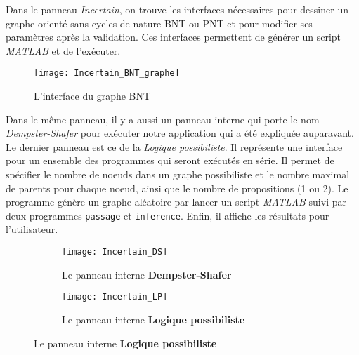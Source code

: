 Dans le panneau \textit{Incertain}, on trouve les interfaces nécessaires pour dessiner un graphe orienté sans
cycles de nature BNT ou PNT et pour modifier ses paramètres après la validation. Ces interfaces permettent de générer
un script \textit{MATLAB} et de l'exécuter.

\begin{figure}[H]
\centering
\texttt{[image: Incertain\_BNT\_graphe]}
\caption{L'interface du graphe BNT}
\end{figure}

Dans le même panneau, il y a aussi un panneau interne qui porte le nom \textit{Dempster-Shafer} pour exécuter
notre application \appname qui a été expliquée auparavant. Le dernier panneau est ce de la \textit{Logique possibiliste}.
Il représente une interface pour un ensemble des programmes qui seront exécutés en série. Il permet de spécifier le nombre
de noeuds dans un graphe possibiliste et le nombre maximal de parents pour chaque noeud, ainsi que le nombre de propositions
(1 ou 2). Le programme génère un graphe aléatoire par lancer un script \textit{MATLAB} suivi par deux programmes
\texttt{passage} et \texttt{inference}. Enfin, il affiche les résultats pour l'utilisateur.

\begin{figure}[H]
\begin{subfigure}{0.49\textwidth}
\texttt{[image: Incertain\_DS]}
\caption{Le panneau interne \textbf{Dempster-Shafer}}
\end{subfigure}
\begin{subfigure}{0.49\textwidth}
\hfill
\texttt{[image: Incertain\_LP]}
\caption{Le panneau interne \textbf{Logique possibiliste}}
\end{subfigure}
\end{figure}
